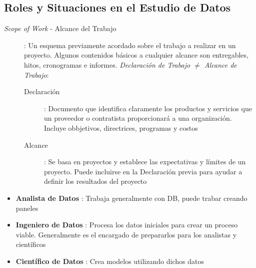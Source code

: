 \subsection{Roles y Situaciones en el Estudio de Datos}
\begin{description}
    \item[\textit{Scope of Work} - Alcance del Trabajo]{ : Un esquema previamente acordado sobre el trabajo a realizar en un proyecto. Algunos contenidos básicos a cualquier alcance son entregables, hitos, cronogramas e informes. \textit{Declaración de Trabajo ${\neq}$ Alcance de Trabajo}:
    \begin{description}
        \item[Declaración]{ : Documento que identifica claramente los productos y servicios que un proveedor o contratista proporcionará a una organización. Incluye obbjetivos, directrices, programas y costos}
        \item[Alcance]{ : Se basa en proyectos y establece las expectativas y límites de un proyecto. Puede incluirse en la Declaración previa para ayudar a definir los resultados del proyecto}
    \end{description}}
\end{description}


\begin{itemize}
    \item {\textbf{Analista de Datos} : Trabaja generalmente con DB, puede trabar creando paneles}
    \item {\textbf{Ingeniero de Datos} : Procesa los datos iniciales para crear un proceso viable. Generalmente es el encargado de prepararlos para los analistas y científicos}
    \item {\textbf{Científico de Datos} : Crea modelos utilizando dichos datos}
\end{itemize}

\newpage